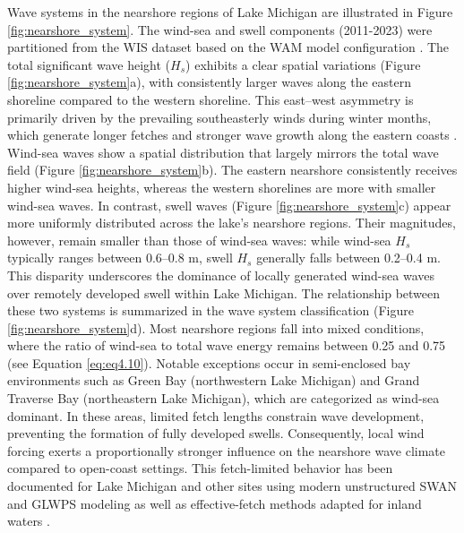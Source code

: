 Wave systems in the nearshore regions of Lake Michigan are illustrated in Figure
\ref{fig:nearshore_system}. The wind-sea and swell components (2011-2023) were
partitioned from the WIS dataset based on the WAM model configuration
\citep{jensen_lake_2012}. The total significant wave height ($H_s$) exhibits a
clear spatial variations (Figure \ref{fig:nearshore_system}a), with consistently
larger waves along the eastern shoreline compared to the western shoreline. This
east–west asymmetry is primarily driven by the prevailing southeasterly winds
during winter months, which generate longer fetches and stronger wave growth
along the eastern coasts \citep{huang_wave_2021,abdelhady_shoreline_2025}.
Wind-sea waves show a spatial distribution that largely mirrors the total wave
field (Figure \ref{fig:nearshore_system}b). The eastern nearshore consistently
receives higher wind-sea heights, whereas the western shorelines are more with
smaller wind-sea waves. In contrast, swell waves (Figure
\ref{fig:nearshore_system}c) appear more uniformly distributed across the lake’s
nearshore regions. Their magnitudes, however, remain smaller than those of
wind-sea waves: while wind-sea $H_s$ typically ranges between 0.6–0.8 m, swell
$H_s$ generally falls between 0.2–0.4 m. This disparity underscores the
dominance of locally generated wind-sea waves over remotely developed swell
within Lake Michigan. The relationship between these two systems is summarized
in the wave system classification (Figure \ref{fig:nearshore_system}d). Most
nearshore regions fall into mixed conditions, where the ratio of wind-sea to
total wave energy remains between 0.25 and 0.75 (see Equation \ref{eq:eq4.10}).
Notable exceptions occur in semi-enclosed bay environments such as Green Bay
(northwestern Lake Michigan) and Grand Traverse Bay (northeastern Lake
Michigan), which are categorized as wind-sea dominant. In these areas, limited
fetch lengths constrain wave development, preventing the formation of fully
developed swells. Consequently, local wind forcing exerts a proportionally
stronger influence on the nearshore wave climate compared to open-coast
settings. This fetch-limited behavior has been documented for Lake Michigan and
other sites using modern unstructured SWAN and GLWPS modeling as well as
effective-fetch methods adapted for inland waters
\citep[\eg][]{mao_modeling_2016,alves2023noaa,rohweder2008application}. 

